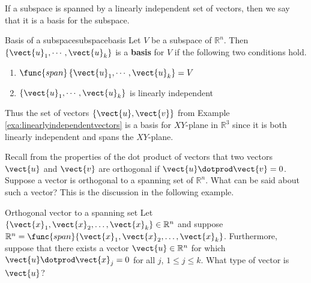 If a subspace is spanned by a linearly independent set of vectors,
then we say that it is a basis for the subspace.

\begin{definition}{Basis of a subspace}{subspacebasis}
Let $V$ be a subspace of $\mathbb{R}^{n}$. Then $\left\{
\vect{u}_{1},\cdots ,\vect{u}_{k}\right\} $ is a \textbf{basis} for
$V$ if the following two conditions
hold.

\begin{enumerate}
\item $\func{span}\left\{ \vect{u}_{1},\cdots ,\vect{u}_{k}\right\} =V$
\item $\left\{ \vect{u}_{1},\cdots ,\vect{u}_{k}\right\} $ is linearly
independent
\end{enumerate}
\end{definition}

Thus the set of vectors $\{\vect{u}, \vect{v}\}$ from Example
\ref{exa:linearlyindependentvectors} is a basis for $XY$-plane in
$\mathbb{R}^{3}$ since it is both linearly independent and spans
the $XY$-plane.

 Recall from the properties of the dot product of vectors 
that two vectors $\vect{u}$ and $\vect{v}$ are orthogonal if $\vect{u}
\dotprod \vect{v} = 0$. Suppose a vector is orthogonal to a spanning set of $\mathbb{R}^n$. What can be said about such a vector? This is the discussion in the following example.

\begin{example}{Orthogonal vector to a spanning set}{}
Let $\{\vect{x}_1, \vect{x}_2, \ldots, \vect{x}_k\}\in\mathbb{R}^n$ and
suppose $\mathbb{R}^n=\func{span}\{\vect{x}_1, \vect{x}_2, \ldots, \vect{x}_k\}$.
Furthermore, suppose that there exists a vector $\vect{u}\in\mathbb{R}^n$ for which $\vect{u}\dotprod \vect{x}_j=0$ for all $j$, $1\leq j\leq k$.
What type of vector is $\vect{u}$?
\end{example}

